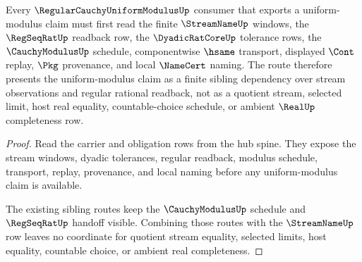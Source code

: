 \begin{theorem}
\label{thm:regular-cauchy-uniform-modulus-streamname-regseqrat-route}
Every $\RegularCauchyUniformModulusUp$ consumer that exports a uniform-modulus claim must first read the finite $\StreamNameUp$ windows, the $\RegSeqRatUp$ readback row, the $\DyadicRatCoreUp$ tolerance rows, the $\CauchyModulusUp$ schedule, componentwise $\hsame$ transport, displayed $\Cont$ replay, $\Pkg$ provenance, and local $\NameCert$ naming. The route therefore presents the uniform-modulus claim as a finite sibling dependency over stream observations and regular rational readback, not as a quotient stream, selected limit, host real equality, countable-choice schedule, or ambient $\RealUp$ completeness row.
\end{theorem}
\begin{proof}
Read the carrier and obligation rows from the hub spine. They expose the stream windows, dyadic tolerances, regular readback, modulus schedule, transport, replay, provenance, and local naming before any uniform-modulus claim is available.

The existing sibling routes keep the $\CauchyModulusUp$ schedule and $\RegSeqRatUp$ handoff visible. Combining those routes with the $\StreamNameUp$ row leaves no coordinate for quotient stream equality, selected limits, host equality, countable choice, or ambient real completeness.
\end{proof}
